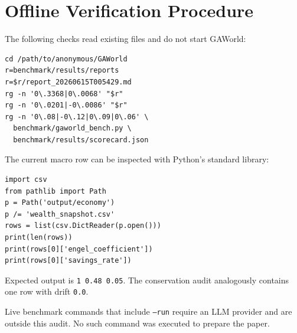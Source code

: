 \documentclass[letterpaper]{article}
\begin{document}
\section{Offline Verification Procedure}

The following checks read existing files and do not start GAWorld:

{\footnotesize
\begin{verbatim}
cd /path/to/anonymous/GAWorld
r=benchmark/results/reports
r=$r/report_20260615T005429.md
rg -n '0\.3368|0\.0068' "$r"
rg -n '0\.0201|-0\.0086' "$r"
rg -n '0\.08|-0\.12|0\.09|0\.06' \
  benchmark/gaworld_bench.py \
  benchmark/results/scorecard.json
\end{verbatim}
}

The current macro row can be inspected with Python's standard library:
{\footnotesize
\begin{verbatim}
import csv
from pathlib import Path
p = Path('output/economy')
p /= 'wealth_snapshot.csv'
rows = list(csv.DictReader(p.open()))
print(len(rows))
print(rows[0]['engel_coefficient'])
print(rows[0]['savings_rate'])
\end{verbatim}
}
Expected output is \texttt{1 0.48 0.05}. The conservation audit analogously contains one row with drift
\texttt{0.0}.

Live benchmark commands that include \texttt{--run} require an LLM provider and are outside this audit. No such
command was executed to prepare the paper.
\end{document}
